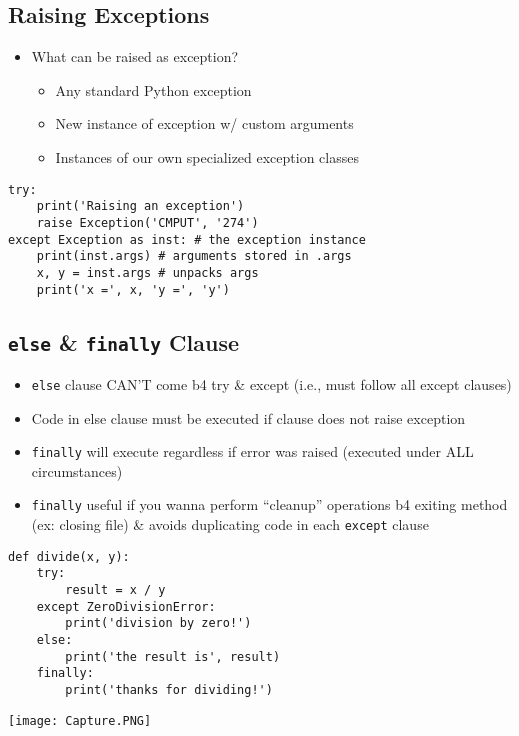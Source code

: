 \documentclass{article}
\begin{document}
\subsection{Raising Exceptions}
    \begin{multicols}{2}
        \begin{itemize}
            \item What can be raised as exception?
                \begin{itemize}
                    \item Any standard Python exception
                    \item New instance of exception w/ custom arguments
                    \item Instances of our own specialized exception classes
                \end{itemize}
        \end{itemize}
    \end{multicols}
\vspace{-2em}
\begin{lstlisting}
try:
    print('Raising an exception')
    raise Exception('CMPUT', '274')
except Exception as inst: # the exception instance
    print(inst.args) # arguments stored in .args
    x, y = inst.args # unpacks args
    print('x =', x, 'y =', 'y')
\end{lstlisting}

\subsection{\texttt{else} \& \texttt{finally} Clause}
    \begin{multicols}{2}
        \begin{itemize}
        \item \texttt{else} clause CAN'T come b4 try \& except (i.e., must follow all except clauses)
            \item Code in else clause must be executed if clause does not raise exception
            \item \texttt{finally} will execute regardless if error was raised (executed under ALL circumstances)
            \item \texttt{finally} useful if you wanna perform ``cleanup'' operations b4 exiting method (ex: closing file) \& avoids duplicating code in each \texttt{except} clause
        \end{itemize}
    \end{multicols}
\vspace{-2em}
\begin{lstlisting}
def divide(x, y):
    try:
        result = x / y
    except ZeroDivisionError:
        print('division by zero!')
    else:
        print('the result is', result)
    finally:
        print('thanks for dividing!')
\end{lstlisting}
\vspace{-1em}
\begin{center}
    \texttt{[image: Capture.PNG]}
\end{center}
\end{document}
